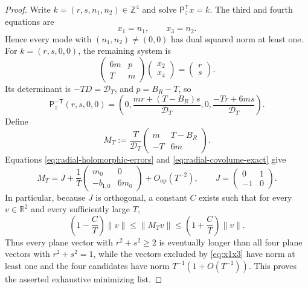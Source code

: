 \documentclass[11pt]{article}
\numberwithin{equation}{section}
\theoremstyle{definition}
\theoremstyle{remark}
\newcommand{\R}{\mathbb R}
\newcommand{\Z}{\mathbb Z}
\newcommand{\T}{\mathbb T}
\begin{document}
\begin{proof}
Write $k=(r,s,n_1,n_2)\in\Z^4$ and solve
$\mathsf P_z^{\mathsf T}x=k$.  The third and fourth equations are
\begin{equation}\label{eq:x1x3}
 x_1=n_1,\qquad x_3=n_2.
\end{equation}
Hence every mode with $(n_1,n_2)\ne(0,0)$ has dual squared norm at least
one.  For $k=(r,s,0,0)$, the remaining system is
\[
 \begin{pmatrix}6m&p\\T&m\end{pmatrix}
 \begin{pmatrix}x_2\\x_4\end{pmatrix}
 =\begin{pmatrix}r\\s\end{pmatrix}.
\]
Its determinant is $-TD=\mathcal D_T$, and $p=B_R-T$, so
\begin{equation}\label{eq:dual-exact}
 \mathsf P_z^{-\mathsf T}(r,s,0,0)
 =\left(
 0,\frac{mr+(T-B_R)s}{\mathcal D_T},
 0,\frac{-Tr+6ms}{\mathcal D_T}
 \right).
\end{equation}
Define
\begin{equation}\label{eq:MT}
 M_T:=\frac{T}{\mathcal D_T}
 \begin{pmatrix}m&T-B_R\\-T&6m\end{pmatrix}.
\end{equation}
Equations \eqref{eq:radial-holomorphic-errors} and
\eqref{eq:radial-covolume-exact} give
\begin{equation}\label{eq:MT-J}
 M_T=J+\frac1T
 \begin{pmatrix}m_0&0\\-b_{\mathrm I,0}&6m_0\end{pmatrix}
 +O_{\mathrm{op}}(T^{-2}),
 \qquad J=\begin{pmatrix}0&1\\-1&0\end{pmatrix}.
\end{equation}
In particular, because $J$ is orthogonal, a constant $C$ exists such that
for every $v\in\R^2$ and every sufficiently large $T$,
\begin{equation}\label{eq:singular-value-bound}
 \left(1-\frac CT\right)\|v\|
 \le\|M_Tv\|
 \le\left(1+\frac CT\right)\|v\|.
\end{equation}
Thus every plane vector with $r^2+s^2\ge2$ is eventually longer than all
four plane vectors with $r^2+s^2=1$, while the vectors excluded by
\eqref{eq:x1x3} have norm at least one and the four candidates have norm
$T^{-1}(1+O(T^{-1}))$.  This proves the asserted exhaustive minimizing list.


\end{proof}
\end{document}
